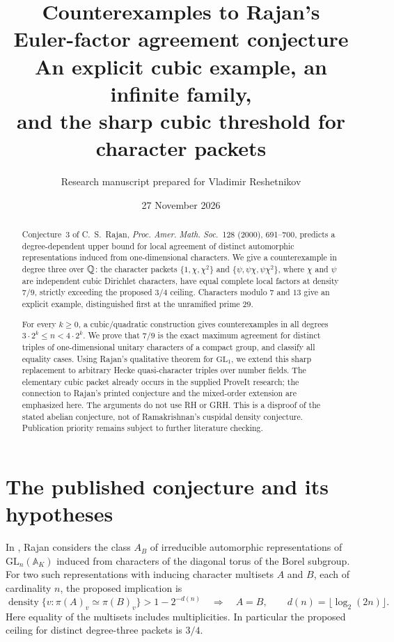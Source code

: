 \documentclass[11pt]{article}
\title{\textbf{Counterexamples to Rajan's\\Euler-factor agreement conjecture}\\[5pt]\large An explicit cubic example, an infinite family,\\and the sharp cubic threshold for character packets}
\author{Research manuscript prepared for Vladimir Reshetnikov}
\date{27 November 2026}
\theoremstyle{remark}\newtheorem{remark}[theorem]{Remark}
\newcommand{\GL}{\mathrm{GL}}\newcommand{\SU}{\mathrm{SU}}\newcommand{\tr}{\operatorname{tr}}
\begin{document}
\maketitle
\begin{abstract}
Conjecture~3 of C.~S.~Rajan, \emph{Proc. Amer. Math. Soc.}~128 (2000), 691--700, predicts a degree-dependent upper bound for local agreement of distinct automorphic representations induced from one-dimensional characters. We give a counterexample in degree three over $\mathbb Q$: the character packets $\{1,\chi,\chi^2\}$ and $\{\psi,\psi\chi,\psi\chi^2\}$, where $\chi$ and $\psi$ are independent cubic Dirichlet characters, have equal complete local factors at density $7/9$, strictly exceeding the proposed $3/4$ ceiling. Characters modulo $7$ and $13$ give an explicit example, distinguished first at the unramified prime $29$.

For every $k\ge0$, a cubic/quadratic construction gives counterexamples in all degrees $3\cdot2^k\le n<4\cdot2^k$. We prove that $7/9$ is the exact maximum agreement for distinct triples of one-dimensional unitary characters of a compact group, and classify all equality cases. Using Rajan's qualitative theorem for $\GL_1$, we extend this sharp replacement to arbitrary Hecke quasi-character triples over number fields. The elementary cubic packet already occurs in the supplied ProveIt research; the connection to Rajan's printed conjecture and the mixed-order extension are emphasized here. The arguments do not use RH or GRH. This is a disproof of the stated abelian conjecture, not of Ramakrishnan's cuspidal density conjecture. Publication priority remains subject to further literature checking.
\end{abstract}

\section{The published conjecture and its hypotheses}

In \cite[Conjecture~3, p.~698]{Rajan}, Rajan considers the class $A_B$ of irreducible automorphic representations of $\GL_n(\mathbb A_K)$ induced from characters of the diagonal torus of the Borel subgroup. For two such representations with inducing character multisets $A$ and $B$, each of cardinality $n$, the proposed implication is
\begin{equation}\label{eq:conjecture}
 \operatorname{density}\{v:\pi(A)_v\simeq\pi(B)_v\}
 >1-2^{-d(n)}\quad\Longrightarrow\quad A=B,
 \qquad d(n)=\lfloor\log_2(2n)\rfloor.
\end{equation}
Here equality of the multisets includes multiplicities. In particular the proposed ceiling for distinct degree-three packets is $3/4$.
\end{document}
